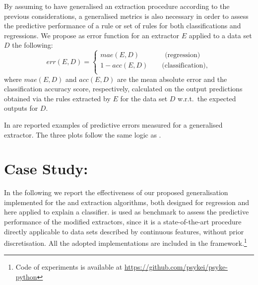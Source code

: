 \documentclass[
]{ceurart}
\begin{document}
By assuming to have generalised an extraction procedure according to the previous considerations, a generalised metrics is also necessary in order to assess the predictive performance of a rule or set of rules for both classifications and regressions.
%
We propose as error function for an extractor $E$ applied to a data set $D$ the following:
%
\begin{equation}
	err(E, D) = 
	\begin{cases}
		mae(E, D) \text{~~~~~~~~~~~(regression)}\\
		1 - acc(E, D) \text{~~~~~~(classification),}\\
	\end{cases}\,\label{eq:error}
\end{equation}
%
where $mae(E, D)$ and $acc(E, D)$ are the mean absolute error and the classification accuracy score, respectively, calculated on the output predictions obtained via the rules extracted by $E$ for the data set $D$ w.r.t.\ the expected outputs for $D$.



In  are reported examples of predictive errors measured for a generalised extractor.
%
The three plots follow the same logic as .

\section{Case Study: \psyke}\label{sec:experiments}


In the following we report the effectiveness of our proposed generalisation implemented for the \iter{} and \gridex{} extraction algorithms, both designed for regression and here applied to explain a classifier.
%
\cart{} is used as benchmark to assess the predictive performance of the modified extractors, since it is a state-of-the-art procedure directly applicable to data sets described by continuous features, without prior discretisation.
%
All the adopted implementations are included in the \psyke{} framework.\footnote{Code of experiments is available at \url{https://github.com/psykei/psyke-python}}
\end{document}
